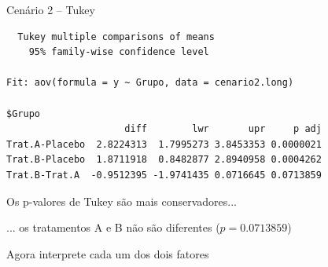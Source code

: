 \documentclass{beamer}
\begin{document}
\begin{frame}[fragile]{\scriptsize }
  \begin{exampleblock}{Cenário 2 -- Tukey}
    \tiny
\begin{verbatim}
  Tukey multiple comparisons of means
    95% family-wise confidence level

Fit: aov(formula = y ~ Grupo, data = cenario2.long)

$Grupo
                     diff        lwr       upr     p adj
Trat.A-Placebo  2.8224313  1.7995273 3.8453353 0.0000021
Trat.B-Placebo  1.8711918  0.8482877 2.8940958 0.0004262
Trat.B-Trat.A  -0.9512395 -1.9741435 0.0716645 0.0713859
\end{verbatim}
  \end{exampleblock}
  \begin{block}{}
    \small
    Os p-valores de Tukey são mais conservadores...

    \bigskip
    ... os tratamentos A e B não são diferentes ($p=0.0713859$)
  \end{block}
\end{frame}

\begin{frame}{\scriptsize }
  \begin{center}
    Agora interprete cada um dos dois fatores
  \end{center}
\end{frame}

\end{document}
